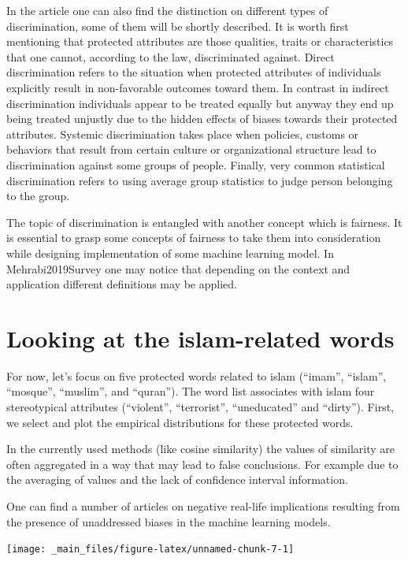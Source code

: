 \documentclass[12pt,]{book}
\begin{document}
In the article one can also find the distinction on different types of discrimination, some of them will be shortly described. It is worth first mentioning that protected attributes are those qualities, traits or characteristics that one cannot, according to the law, discriminated against.
Direct discrimination refers to the situation when protected attributes of individuals explicitly result in non-favorable outcomes toward them. In contrast in indirect discrimination individuals appear to be treated equally but anyway they end up being treated unjustly due to the hidden effects of biases towards their protected attributes. Systemic discrimination takes place when policies, customs or behaviors that result from certain culture or organizational structure lead to discrimination against some groups of people. Finally, very common statistical discrimination refers to using
average group statistics to judge person belonging to the group.

The topic of discrimination is entangled with another concept which is fairness. It is essential to grasp some concepts of fairness to take them into
consideration while designing implementation of some machine learning model. In Mehrabi2019Survey one may notice that depending on the context and application different definitions may be applied.

\section{Looking at the islam-related
words}\label{looking-at-the-islam-related-words}

For now, let's focus on five protected words related to islam (``imam'',
``islam'', ``mosque'', ``muslim'', and ``quran''). The word list
associates with islam four stereotypical attributes (``violent'',
``terrorist'', ``uneducated'' and ``dirty''). First, we select and plot
the empirical distributions for these protected words.

In the currently used methods (like cosine similarity) the values of similarity are often aggregated in a way that may lead to false conclusions. For
example due to the averaging of values and the lack of confidence interval information.

One can find a number of articles on negative real-life implications resulting from the presence of unaddressed biases in the machine learning models.

\begin{center}\texttt{[image: \_main\_files/figure-latex/unnamed-chunk-7-1]} \end{center}
\end{document}
